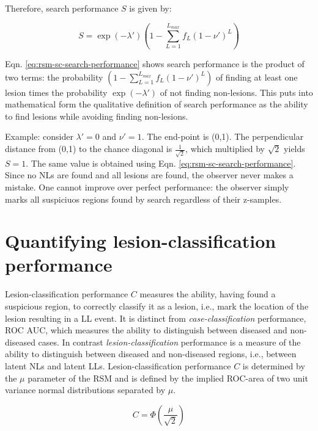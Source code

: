 \documentclass[
]{book}
\begin{document}
Therefore, search performance \(S\) is given by:

\begin{equation} 
S=\exp\left ( -\lambda' \right )\left (1-\sum_{L=1}^{L_{max}}f_L\left ( 1-\nu'  \right )^L  \right )
\label{eq:rsm-sc-search-performance}
\end{equation}

Eqn. \eqref{eq:rsm-sc-search-performance} shows search performance is the product of two terms: the probability \(\left (1-\sum_{L=1}^{L_{max}}f_L\left ( 1-\nu' \right )^L \right )\) of finding at least one lesion times the probability \(\exp\left ( -\lambda' \right )\) of not finding non-lesions. This puts into mathematical form the qualitative definition of search performance as the ability to find lesions while avoiding finding non-lesions.

Example: consider \(\lambda' = 0\) and \(\nu' = 1\). The end-point is (0,1). The perpendicular distance from (0,1) to the chance diagonal is \(\frac{1}{\sqrt{2}}\), which multiplied by \(\sqrt{2}\) yields \(S = 1\). The same value is obtained using Eqn. \eqref{eq:rsm-sc-search-performance}. Since no NLs are found and all lesions are found, the observer never makes a mistake. One cannot improve over perfect performance: the observer simply marks all suspiciuos regions found by search regardless of their z-samples.

\hypertarget{rsm-sc-performance}{%
\section{Quantifying lesion-classification performance}\label{rsm-sc-performance}}

Lesion-classification performance \(C\) measures the ability, having found a suspicious region, to correctly classify it as a lesion, i.e., mark the location of the lesion resulting in a LL event. It is distinct from \emph{case-classification} performance, ROC AUC, which measures the ability to distinguish between diseased and non-diseased cases. In contrast \emph{lesion-classification} performance is a measure of the ability to distinguish between diseased and non-diseased regions, i.e., between latent NLs and latent LLs. Lesion-classification performance \(C\) is determined by the \(\mu\) parameter of the RSM and is defined by the implied ROC-area of two unit variance normal distributions separated by \(\mu\).

\begin{equation}
C=\Phi\left ( \frac{\mu}{\sqrt{2}} \right )
\label{eq:rsm-sc-classification-performance}
\end{equation}
\end{document}
